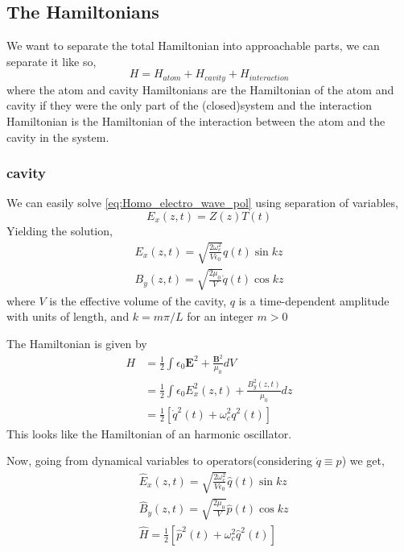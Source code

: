 \documentclass[english, a4paper, 12pt, twoside]{article}
\numberwithin{equation}{section} %
\begin{document}
\subsection{The Hamiltonians}
We want to separate the total Hamiltonian into approachable parts, we can separate it like so,
\[
    H = H_{atom} + H_{cavity} + H_{interaction}
\]
where the atom and cavity Hamiltonians are the Hamiltonian of the atom and cavity if they were the only part of the (closed)system and the interaction Hamiltonian is the Hamiltonian of the interaction between the atom and the cavity in the system.

\subsubsection{cavity}

We can easily solve \ref{eq:Homo_electro_wave_pol} using separation of variables,
$$E_x(z, t)= Z(z)T(t)$$
Yielding the solution,
\begin{equation}
    \begin{split}
        E_x(z, t) = \sqrt{\frac{2 \omega_c^2}{V \epsilon_0}}q(t)\sin{kz} \\
        B_y(z, t) = \sqrt{\frac{2 \mu_0}{V}}\dot{q}(t)\cos{kz}
    \end{split}
\end{equation}
where $V$ is the effective volume of the cavity, $q$ is a time-dependent amplitude with units of length, and $k = m\pi/L$ for
an integer $m > 0$

The Hamiltonian is given by
\begin{align}
    H &= \frac{1}{2}\int\epsilon_0 \textbf{E}^2 + \frac{\textbf{B}^2}{\mu_0} dV \\
    &= \frac{1}{2}\int\epsilon_0 E_x^2(z, t) + \frac{B_y^2(z, t)}{\mu_0} dz \\
    &= \frac{1}{2}[\dot{q}^2(t) + \omega_c^2 q^2(t)]
\end{align}
This looks like the Hamiltonian of an harmonic oscillator.

Now, going from dynamical variables to operators(considering $\dot{q} \equiv p$) we get,
\begin{align}
     &\hat{E}_x(z, t) = \sqrt{\frac{2 \omega_c^2}{V \epsilon_0}}\hat{q}(t)\sin{kz} \\
     &\hat{B}_y(z, t) = \sqrt{\frac{2 \mu_0}{V}}\hat{p}(t)\cos{kz} \\
     &\hat{H} = \frac{1}{2}[\hat{p}^2(t) + \omega_c^2 \hat{q}^2(t)]
\end{align}
\end{document}
